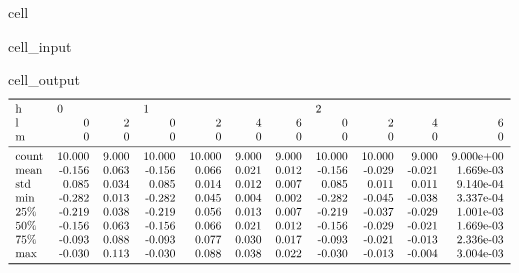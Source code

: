 \documentclass[letterpaper,table,10pt,english]{jupyterBook}
\begin{document}
\begin{sphinxuseclass}{cell}\begin{sphinxVerbatimInput}

\begin{sphinxuseclass}{cell_input}
\begin{sphinxVerbatim}[commandchars=\\\{\}]
\end{sphinxVerbatim}

\end{sphinxuseclass}\end{sphinxVerbatimInput}
\begin{sphinxVerbatimOutput}

\begin{sphinxuseclass}{cell_output}\begin{equation*}
\begin{split}\begin{tabular}{lrrrrrrrrrr}
\toprule
h & \multicolumn{2}{l}{0} & \multicolumn{4}{l}{1} & \multicolumn{4}{l}{2} \\
l &       0 &      2 &       0 &       2 &      4 &      6 &       0 &       2 &      4 &          6 \\
m &       0 &      0 &       0 &       0 &      0 &      0 &       0 &       0 &      0 &          0 \\
\midrule
count &  10.000 &  9.000 &  10.000 &  10.000 &  9.000 &  9.000 &  10.000 &  10.000 &  9.000 &  9.000e+00 \\
mean  &  -0.156 &  0.063 &  -0.156 &   0.066 &  0.021 &  0.012 &  -0.156 &  -0.029 & -0.021 &  1.669e-03 \\
std   &   0.085 &  0.034 &   0.085 &   0.014 &  0.012 &  0.007 &   0.085 &   0.011 &  0.011 &  9.140e-04 \\
min   &  -0.282 &  0.013 &  -0.282 &   0.045 &  0.004 &  0.002 &  -0.282 &  -0.045 & -0.038 &  3.337e-04 \\
25\%   &  -0.219 &  0.038 &  -0.219 &   0.056 &  0.013 &  0.007 &  -0.219 &  -0.037 & -0.029 &  1.001e-03 \\
50\%   &  -0.156 &  0.063 &  -0.156 &   0.066 &  0.021 &  0.012 &  -0.156 &  -0.029 & -0.021 &  1.669e-03 \\
75\%   &  -0.093 &  0.088 &  -0.093 &   0.077 &  0.030 &  0.017 &  -0.093 &  -0.021 & -0.013 &  2.336e-03 \\
max   &  -0.030 &  0.113 &  -0.030 &   0.088 &  0.038 &  0.022 &  -0.030 &  -0.013 & -0.004 &  3.004e-03 \\
\bottomrule
\end{tabular}\end{split}
\end{equation*}
\end{sphinxuseclass}\end{sphinxVerbatimOutput}

\end{sphinxuseclass}
\end{document}
